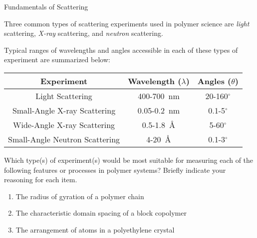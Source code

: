 \begin{activity}{Fundamentals of Scattering}
\begin{infobox}
	Three common types of scattering experiments used in polymer science are \emph{light} scattering, \emph{X-ray} scattering, and \emph{neutron} scattering.
	
	Typical ranges of wavelengths and angles accessible in each of these types of experiment are summarized below:
	
	\begin{center}
	\renewcommand{\arraystretch}{1.3}
	\begin{tabular}{ccc}
		\hline
		\textbf{Experiment} & \textbf{Wavelength ($\lambda$)} & \textbf{Angles ($\theta$)}\\\hline
		Light Scattering & 400-700~nm & 20-160${}^\circ$ \\
		Small-Angle X-ray Scattering & 0.05-0.2~nm & 0.1-5${}^\circ$\\ 
		Wide-Angle X-ray Scattering & 0.5-1.8~\AA & 5-60${}^\circ$\\
		Small-Angle Neutron Scattering & 4-20~\AA & 0.1-3${}^\circ$\\\hline
	\end{tabular}
	\end{center}

\end{infobox}

\begin{ctqs}

	\question Which type(s) of experiment(s) would be most suitable for measuring each of the following features or processes in polymer systems?  Briefly indicate your reasoning for each item.
	
		\begin{enumerate}
		
			\item The radius of gyration of a polymer chain
			
				\begin{solution}[0.5in]
				\end{solution}
			
			\item The characteristic domain spacing of a block copolymer
			
				\begin{solution}[0.5in]
				\end{solution}
				
			\item The arrangement of atoms in a polyethylene crystal
			
				\begin{solution}[0.5in]
				\end{solution}
			

\end{enumerate}
\end{ctqs}
\end{activity}
